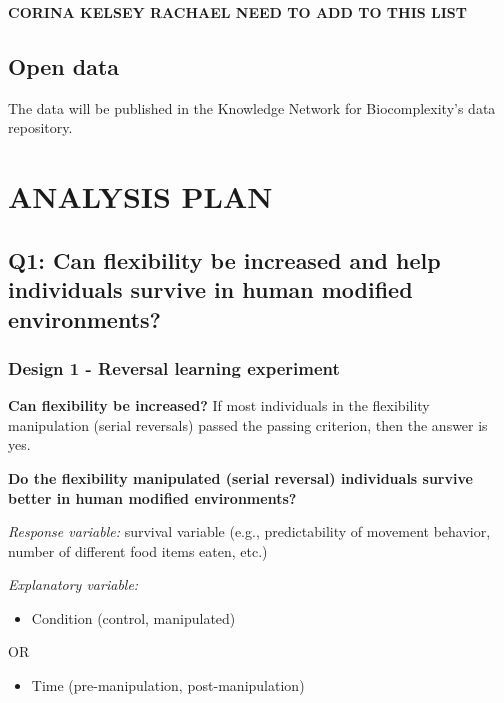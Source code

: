 \documentclass[
]{article}
\providecommand{\tightlist}{%
  \setlength{\itemsep}{0pt}\setlength{\parskip}{0pt}}
\begin{document}
\textbf{CORINA KELSEY RACHAEL NEED TO ADD TO THIS LIST}

\hypertarget{open-data}{%
\subsection{Open data}\label{open-data}}

The data will be published in the Knowledge Network for Biocomplexity's
data repository.

\hypertarget{analysis-plan}{%
\section{ANALYSIS PLAN}\label{analysis-plan}}

\hypertarget{q1-can-flexibility-be-increased-and-help-individuals-survive-in-human-modified-environments}{%
\subsection{Q1: Can flexibility be increased and help individuals
survive in human modified
environments?}\label{q1-can-flexibility-be-increased-and-help-individuals-survive-in-human-modified-environments}}

\hypertarget{design-1---reversal-learning-experiment-1}{%
\subsubsection{Design 1 - Reversal learning
experiment}\label{design-1---reversal-learning-experiment-1}}

\textbf{Can flexibility be increased?} If most individuals in the
flexibility manipulation (serial reversals) passed the passing
criterion, then the answer is yes.

\textbf{Do the flexibility manipulated (serial reversal) individuals
survive better in human modified environments?}

\emph{Response variable:} survival variable (e.g., predictability of
movement behavior, number of different food items eaten, etc.)

\emph{Explanatory variable:}

\begin{itemize}
\tightlist
\item
  Condition (control, manipulated)
\end{itemize}

OR

\begin{itemize}
\tightlist
\item
  Time (pre-manipulation, post-manipulation)
\end{itemize}
\end{document}
